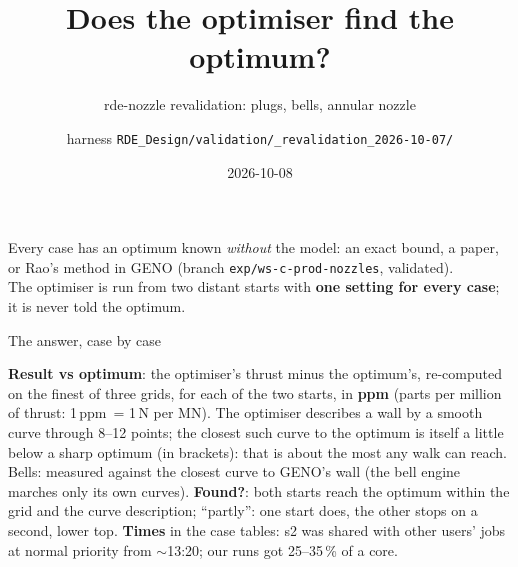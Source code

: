 \documentclass[aspectratio=169,10pt]{beamer}
\title{Does the optimiser find the optimum?}
\subtitle{rde-nozzle revalidation: plugs, bells, annular nozzle}
\author{harness \texttt{RDE\_Design/validation/\_revalidation\_2026-10-07/}}
\date{2026-10-08}
\newcommand{\ppm}{\,ppm}
\begin{document}
\begin{frame}
\titlepage
\vspace{-6mm}
\begin{center}\small
Every case has an optimum known \emph{without} the model: an exact bound, a paper, or Rao's method in GENO
(branch \texttt{exp/ws-c-prod-nozzles}, validated).\\[1mm]
The optimiser is run from two distant starts with \textbf{one setting for every case}; it is never told the optimum.
\end{center}
\end{frame}

\begin{frame}{The answer, case by case}
\centering\small
\resizebox{0.97\linewidth}{!}{}

\vspace{3mm}
\begin{minipage}{0.95\linewidth}\footnotesize
\textbf{Result vs optimum}: the optimiser's thrust minus the optimum's, re-computed on the finest of three grids, for each
of the two starts, in \textbf{ppm} (parts per million of thrust: 1\ppm\ = 1\,N per MN). The optimiser describes a wall
by a smooth curve through 8--12 points; the closest such curve to the optimum is itself a little below a sharp optimum
(in brackets): that is about the most any walk can reach. Bells: measured against the closest curve to GENO's wall (the
bell engine marches only its own curves). \textbf{Found?}: both starts reach the optimum within the grid and the curve
description; ``partly'': one start does, the other stops on a second, lower top. \textbf{Times} in the case tables: s2
was shared with other users' jobs at normal priority from $\sim$13:20; our runs got 25--35\,\% of a core.
\end{minipage}
\end{frame}
\end{document}
